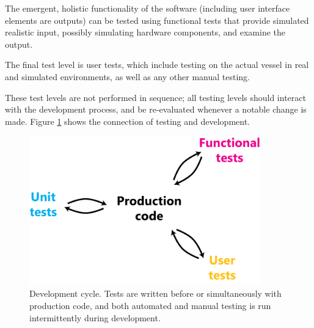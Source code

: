 The emergent, holistic functionality of the software (including user interface elements are outputs) can be tested using functional tests that provide simulated realistic input, possibly simulating hardware components, and examine the output.

The final test level is user tests, which include testing on the actual vessel in real and simulated environments, as well as any other manual testing.

These test levels are not performed in sequence; all testing levels should interact with the development process, and be re-evaluated whenever a notable change is made. Figure \ref{fig:software-testing} shows the connection of testing and development.

\begin{figure}[h]
\includegraphics[width=100mm,natwidth=494,natheight=299]{"./image/software-testing"}
\caption[Software development cycle]{\label{fig:software-testing}Development cycle. Tests are written before or simultaneously with production code, and both automated and manual testing is run intermittently during development.}
\end{figure}
